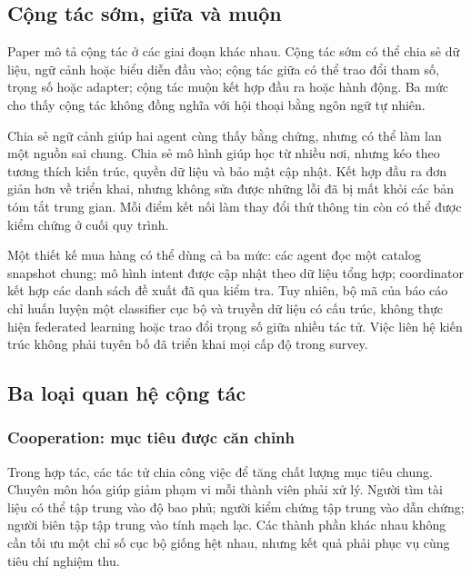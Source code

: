 \subsection{Cộng tác sớm, giữa và
muộn}\label{cux1ed9ng-tuxe1c-sux1edbm-giux1eefa-vuxe0-muux1ed9n}

Paper mô tả cộng tác ở các giai đoạn khác nhau. Cộng tác sớm có thể chia
sẻ dữ liệu, ngữ cảnh hoặc biểu diễn đầu vào; cộng tác giữa có thể trao
đổi tham số, trọng số hoặc adapter; cộng tác muộn kết hợp đầu ra hoặc
hành động. Ba mức cho thấy cộng tác không đồng nghĩa với hội thoại bằng
ngôn ngữ tự nhiên.

Chia sẻ ngữ cảnh giúp hai agent cùng thấy bằng chứng, nhưng có thể làm
lan một nguồn sai chung. Chia sẻ mô hình giúp học từ nhiều nơi, nhưng
kéo theo tương thích kiến trúc, quyền dữ liệu và bảo mật cập nhật. Kết
hợp đầu ra đơn giản hơn về triển khai, nhưng không sửa được những lỗi đã
bị mất khỏi các bản tóm tắt trung gian. Mỗi điểm kết nối làm thay đổi
thứ thông tin còn có thể được kiểm chứng ở cuối quy trình.

Một thiết kế mua hàng có thể dùng cả ba mức: các agent đọc một catalog
snapshot chung; mô hình intent được cập nhật theo dữ liệu tổng hợp;
coordinator kết hợp các danh sách đề xuất đã qua kiểm tra. Tuy nhiên, bộ
mã của báo cáo chỉ huấn luyện một classifier cục bộ và truyền dữ liệu có
cấu trúc, không thực hiện federated learning hoặc trao đổi trọng số giữa
nhiều tác tử. Việc liên hệ kiến trúc không phải tuyên bố đã triển khai
mọi cấp độ trong survey.

\subsection{Ba loại quan hệ cộng
tác}\label{ba-loux1ea1i-quan-hux1ec7-cux1ed9ng-tuxe1c}

\subsubsection{Cooperation: mục tiêu được căn
chỉnh}\label{cooperation-mux1ee5c-tiuxeau-ux111ux1b0ux1ee3c-cux103n-chux1ec9nh}

Trong hợp tác, các tác tử chia công việc để tăng chất lượng mục tiêu
chung. Chuyên môn hóa giúp giảm phạm vi mỗi thành viên phải xử lý. Người
tìm tài liệu có thể tập trung vào độ bao phủ; người kiểm chứng tập trung
vào dẫn chứng; người biên tập tập trung vào tính mạch lạc. Các thành
phần khác nhau không cần tối ưu một chỉ số cục bộ giống hệt nhau, nhưng
kết quả phải phục vụ cùng tiêu chí nghiệm thu.

